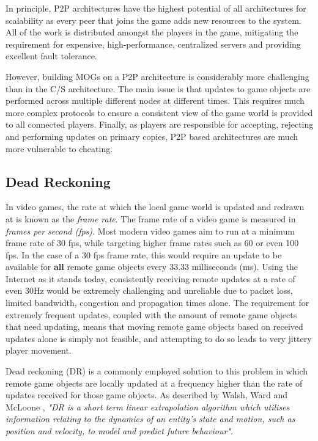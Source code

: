 In principle, P2P architectures have the highest potential of all architectures for scalability as every peer that joins the game adds new resources to the system. All of the work is distributed amongst the players in the game, mitigating the requirement for expensive, high-performance, centralized servers and providing excellent fault tolerance. 

However, building MOGs on a P2P architecture is considerably more challenging than in the C/S architecture. The main issue is that updates to game objects are performed across multiple different nodes at different times. This requires much more complex protocols to ensure a consistent view of the game world is provided to all connected players. Finally, as players are responsible for accepting, rejecting and performing updates on primary copies, P2P based architectures are much more vulnerable to cheating. 

\subsection{Dead Reckoning}\label{sec:sota:dead-reckoning}
In video games, the rate at which the local game world is updated and redrawn at is known as the \textit{frame rate}. The frame rate of a video game is measured in \textit{frames per second (fps)}. Most modern video games aim to run at a minimum frame rate of 30 fps, while targeting higher frame rates such as 60 or even 100 fps. In the case of a 30 fps frame rate, this would require an update to be available for \textbf{all} remote game objects every 33.33 milliseconds (ms). Using the Internet as it stands today, consistently receiving remote updates at a rate of even 30Hz would be extremely challenging and unreliable due to packet loss, limited bandwidth, congestion and propagation times alone. The requirement for extremely frequent updates, coupled with the amount of remote game objects that need updating, means that moving remote game objects based on received updates alone is simply not feasible, and attempting to do so leads to very jittery player movement.

Dead reckoning (DR) is a commonly employed solution to this problem in which remote game objects are locally updated at a frequency higher than the rate of updates received for those game objects. As described by Walsh, Ward and McLoone \cite{dead-reckoning}, \textit{"DR is a short term linear extrapolation algorithm which utilises information relating to the dynamics of an entity’s state and motion, such as position and velocity, to model and predict future behaviour"}.

